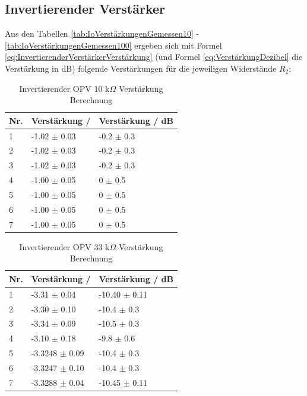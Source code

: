 \documentclass[12pt,a4paper,twoside]{article}
\begin{document}
\subsection{Invertierender Verstärker}

Aus den Tabellen \ref{tab:IoVerstärkungenGemessen10} - \ref{tab:IoVerstärkungenGemessen100} ergeben sich mit Formel \ref{eq:InvertierenderVerstärkerVerstärkung} (und Formel \ref{eq:VerstärkungDezibel} die Verstärkung in dB) folgende Verstärkungen für die jeweiligen Widerstände $R_{2}$:

\begin{table}[H]
    \centering
    \caption{Invertierender OPV 10 k$\Omega$ Verstärkung Berechnung}
    \label{tab:IoVerstärkungenBerechnet10}
    \begin{tabular}{| l | l | l |}
        \hline
        Nr. & Verstärkung / & Verstärkung / dB \\
        \hline
        1 & -1.02 $\pm$ 0.03 & -0.2 $\pm$ 0.3 \\
        2 & -1.02 $\pm$ 0.03 & -0.2 $\pm$ 0.3 \\
        3 & -1.02 $\pm$ 0.03 & -0.2 $\pm$ 0.3 \\
        4 & -1.00 $\pm$ 0.05 &  0 $\pm$ 0.5 \\
        5 & -1.00 $\pm$ 0.05 &  0 $\pm$ 0.5 \\
        6 & -1.00 $\pm$ 0.05 &  0 $\pm$ 0.5 \\
        7 & -1.00 $\pm$ 0.05 &  0 $\pm$ 0.5 \\
        \hline
    \end{tabular}
\end{table}

\begin{table}[H]
    \centering
    \caption{Invertierender OPV 33 k$\Omega$ Verstärkung Berechnung}
    \label{tab:IoVerstärkungenBerechnet33}
    \begin{tabular}{| l | l | l |}
        \hline
        Nr. & Verstärkung / & Verstärkung / dB \\
        \hline
        1 & -3.31 $\pm$ 0.04 & -10.40 $\pm$ 0.11 \\
        2 & -3.30 $\pm$ 0.10 & -10.4 $\pm$ 0.3 \\
        3 & -3.34 $\pm$ 0.09 & -10.5 $\pm$ 0.3 \\
        4 & -3.10 $\pm$ 0.18 & -9.8 $\pm$ 0.6 \\
        5 & -3.3248 $\pm$ 0.09 & -10.4 $\pm$ 0.3 \\
        6 & -3.3247 $\pm$ 0.10 & -10.4 $\pm$ 0.3 \\
        7 & -3.3288 $\pm$ 0.04 & -10.45 $\pm$ 0.11 \\
        \hline
    \end{tabular}
\end{table}
\end{document}
